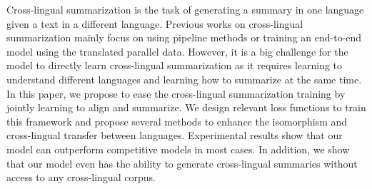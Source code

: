 Cross-lingual summarization is the task of generating a summary in one language given a text in a different language. Previous works on cross-lingual summarization mainly focus on using pipeline methods or training an end-to-end model using the translated parallel data. However, it is a big challenge for the model to directly learn cross-lingual summarization as it requires learning to understand different languages and learning how to summarize at the same time. In this paper, we propose to ease the cross-lingual summarization training by jointly learning to align and summarize. We design relevant loss functions to train this framework and propose several methods to enhance the isomorphism and cross-lingual transfer between languages. Experimental results show that our model can outperform competitive models in most cases. In addition, we show that our model even has the ability to generate cross-lingual summaries without access to any cross-lingual corpus.
